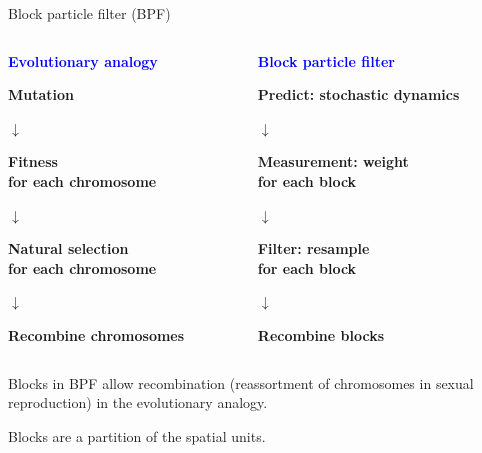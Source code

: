 \documentclass{beamer}
\begin{document}
\begin{frame}{Block particle filter (BPF)}

  \begin{columns}
    \begin{column}{0.48\linewidth}
      \begin{center}
      {\bf \textcolor{blue}{Evolutionary analogy}}

      \vspace{5mm}
      
      {\bf Mutation}

      $\downarrow$

      {\bf Fitness\\
      for each chromosome}

      $\downarrow$

      {\bf Natural selection\\
      for each chromosome}

      $\downarrow$

      {\bf Recombine chromosomes}
      
      \end{center}
    \end{column}
     \begin{column}{0.48\linewidth}
      \begin{center}
      {\bf \textcolor{blue}{Block particle filter}}

      \vspace{5mm}
      
      {\bf Predict: stochastic dynamics}

      $\downarrow$

      {\bf Measurement: weight\\
      for each block}

      $\downarrow$

      {\bf Filter: resample\\
      for each block}

      $\downarrow$

      {\bf Recombine blocks}
      \end{center}
    \end{column}
  \end{columns}

  \vspace{10mm}
  
    \begin{myitemize}
    \item Blocks in BPF allow recombination (reassortment of chromosomes in sexual reproduction) in the evolutionary analogy.
\item Blocks are a partition of the spatial units. 
  \end{myitemize}

\end{frame}
\end{document}

